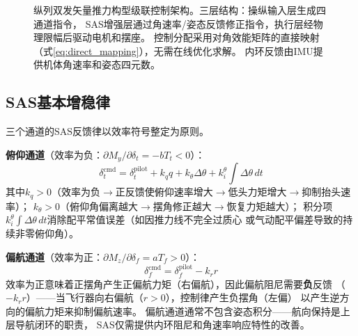 \documentclass[a4paper,12pt]{ctexart}
\theoremstyle{plain}
\theoremstyle{definition}
\begin{document}
\begin{figure}[H]
\caption{纵列双发矢量推力构型级联控制架构。三层结构：操纵输入层生成四通道指令，
SAS增强层通过角速率/姿态反馈修正指令，执行层经物理限幅后驱动电机和摆座。
控制分配采用对角效能矩阵的直接映射（式\ref{eq:direct_mapping}），无需在线优化求解。
内环反馈由IMU提供机体角速率和姿态四元数。}
\label{fig:control_architecture}
\end{figure}

\subsection{SAS基本增稳律}

三个通道的SAS反馈律以效率符号整定为原则。

\textbf{俯仰通道}（效率为负：$\partial M_y / \partial \delta_t = -b T_t < 0$）：
\begin{equation}
    \delta_t^{\text{cmd}} = \delta_t^{\text{pilot}}
    + k_q q + k_\theta \Delta\theta
    + k_i^\theta \int \Delta\theta \, dt
    \label{eq:sas_pitch}
\end{equation}
其中$k_q > 0$（效率为负$\to$正反馈使俯仰速率增大$\to$低头力矩增大$\to$抑制抬头速率）；
$k_\theta > 0$（俯仰角偏离越大$\to$摆角修正越大$\to$恢复力矩越大）；
积分项$k_i^\theta \int \Delta\theta \, dt$消除配平常值误差（如因推力线不完全过质心
或气动配平偏差导致的持续非零俯仰角）。

\textbf{偏航通道}（效率为正：$\partial M_z / \partial \delta_f = a T_f > 0$）：
\begin{equation}
    \delta_f^{\text{cmd}} = \delta_f^{\text{pilot}}
    - k_r r
    \label{eq:sas_yaw}
\end{equation}
效率为正意味着正摆角产生正偏航力矩（右偏航），因此偏航阻尼需要\textbf{负}反馈
（$-k_r r$）——当飞行器向右偏航（$r > 0$），控制律产生负摆角（左偏）
以产生逆方向的偏航力矩来抑制偏航速率。
偏航通道通常不包含姿态积分——航向保持是上层导航闭环的职责，
SAS仅需提供内环阻尼和角速率响应特性的改善。
\end{document}
